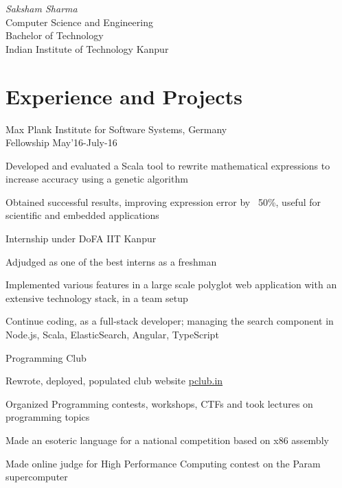 \documentclass{tccv}
\begin{document}
{ \textit{Saksham \textcolor{myred}{Sharma}}}
\medskip\\
\large{Computer Science and Engineering}\\
\large{Bachelor of Technology}\\
{Indian Institute of Technology Kanpur}

\vspace{-0.4cm}
\section{Experience and Projects}
\vspace{-0.1cm}
\begin{experience}

  {Max Plank Institute for Software Systems, \small{Germany}\\
  Fellowship \hfill May'16-July-16}
  {
  \item Developed and evaluated a Scala tool to rewrite
    mathematical expressions to increase accuracy using a genetic
    algorithm
  \item Obtained successful results, improving expression error by
    ~50\%, useful for scientific and embedded applications
  }

  {Internship under DoFA IIT Kanpur}
  {
  \item Adjudged as one of the best interns as a freshman
  \item Implemented various features in a large scale polyglot web
    application with an extensive technology stack, in a team setup
  \item Continue coding, as a full-stack developer;
    managing the search component in Node.js, Scala, ElasticSearch,
    Angular, TypeScript
  }

  {Programming Club}
  {
  \item Rewrote, deployed, populated club website \href{http://pclub.in}{pclub.in}
  \item Organized Programming contests, workshops, CTFs and took
    lectures on programming topics
  }

  {
  \item Made an esoteric language for a national
    competition based on x86 assembly
  \item Made online judge for High Performance Computing contest
    on the Param supercomputer
  }


\end{experience}
\end{document}
